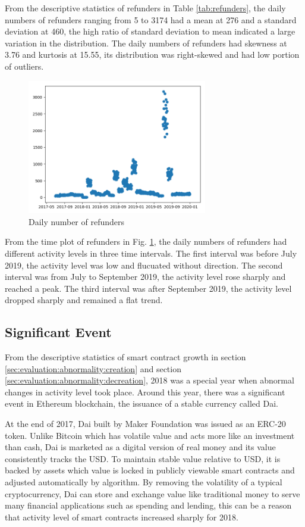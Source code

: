 From the descriptive statistics of refunders in Table \ref{tab:refunders}, the daily numbers of refunders ranging from 5 to 3174 had a mean at 276 and a standard deviation at 460, the high ratio of standard deviation to mean indicated a large variation in the distribution. The daily numbers of refunders had skewness at 3.76 and kurtosis at 15.55, its distribution was right-skewed and had low portion of outliers.

\begin{figure}[htb]
\includegraphics[width=0.7\textwidth]{gfx/refunders.png}
\caption{Daily number of refunders}
\label{fig:refunders}
\end{figure}

From the time plot of refunders in Fig. \ref{fig:refunders}, the daily numbers of refunders had different activity levels in three time intervals. The first interval was before July 2019, the activity level was low and flucuated without direction. The second interval was from July to September 2019, the activity level rose sharply and reached a peak. The third interval was after September 2019, the activity level dropped sharply and remained a flat trend.

\subsection{Significant Event}
\label{sec:evaluation:abnormality:event}

From the descriptive statistics of smart contract growth in section \ref{sec:evaluation:abnormality:creation} and section \ref{sec:evaluation:abnormality:decreation}, 2018 was a special year when abnormal changes in activity level took place. Around this year, there was a significant event in Ethereum blockchain, the issuance of a stable currency called Dai.

At the end of 2017, Dai built by Maker Foundation was issued as an ERC-20 token. Unlike Bitcoin which has volatile value and acts more like an investment than cash, Dai is marketed as a digital version of real money and its value consistently tracks the USD. To maintain stable value relative to USD, it is backed by assets which value is locked in publicly viewable smart contracts and adjusted automatically by algorithm. By removing the volatility of a typical cryptocurrency, Dai can store and exchange value like traditional money to serve many financial applications such as spending and lending, this can be a reason that activity level of smart contracts increased sharply for 2018.

